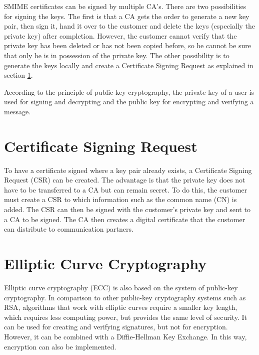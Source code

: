 \documentclass[12pt,oneside,a4paper,parskip]{scrbook}
\begin{document}
SMIME certificates can be signed by multiple CA's. There are two possibilities for signing the keys. The first is that a CA gets the order to generate a new key pair, then sign it, hand it over to the customer and delete the keys (especially the private key) after completion. However, the customer cannot verify that the private key has been deleted or has not been copied before, so he cannot be sure that only he is in possession of the private key. The other possibility is to generate the keys locally and create a Certificate Signing Request as explained in section \ref{sec:CSR}.
\parencite{luber_smime_2018}

According to the principle of public-key cryptography, the private key of a user is used for signing and decrypting and the public key for encrypting and verifying a message.

\section{Certificate Signing Request}
\label{sec:CSR}

To have a certificate signed where a key pair already exists, a Certificate Signing Request (CSR) can be created. The advantage is that the private key does not have to be transferred to a CA but can remain secret. To do this, the customer must create a CSR to which information such as the common name (CN) is added. The CSR can then be signed with the customer's private key and sent to a CA to be signed. The CA then creates a digital certificate that the customer can distribute to communication partners.
\parencite{publico_ssl-grundlagen_2017}

\section{Elliptic Curve Cryptography}

Elliptic curve cryptography (ECC) is also based on the system of public-key cryptography. In comparison to other public-key cryptography systems such as RSA, algorithms that work with elliptic curves require a smaller key length, which requires less computing power, but provides the same level of security. It can be used for creating and verifying signatures, but not for encryption. However, it can be combined with a Diffie-Hellman Key Exchange. In this way, encryption can also be implemented.
\parencite{sullivan_relatively_2013}
\end{document}

